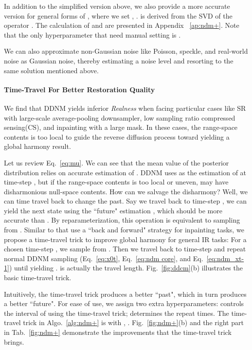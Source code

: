 \documentclass{article} \usepackage{iclr2023_conference,times}
\begin{document}
In addition to the simplified version above, we also provide a more accurate version for general forms of , where we set , .  is derived from the SVD of the operator 
. The calculation of  and  are presented in Appendix ~\ref{ap:ndm+}. Note that the only hyperparameter that need manual setting is .

We can also approximate non-Gaussian noise like Poisson, speckle, and real-world noise as Gaussian noise, thereby estimating a noise level  and resorting to the same solution mentioned above.

\paragraph{Time-Travel For Better Restoration Quality} We find that DDNM yields inferior \textit{Realness} when facing particular cases like SR with large-scale average-pooling downsampler, low sampling ratio compressed sensing(CS), and inpainting with a large mask. In these cases, the range-space contents  is too local to guide the reverse diffusion process toward yielding a global harmony result.

Let us review Eq.~\ref{eq:mu}. We can see that the mean value  of the posterior distribution  relies on accurate estimation of . DDNM uses  as the estimation of  at time-step , but if the range-space contents  is too local or uneven,  may have disharmonious null-space contents. How can we salvage the disharmony? Well, we can time travel back to change the past. Say we travel back to time-step , we can yield the next state  using the ``future" estimation  , which should be more accurate than . By reparameterization, this operation is equivalent to sampling  from . Similar to \cite{lugmayr2022repaint} that use a ``back and forward" strategy for inpainting tasks, we propose a time-travel trick to improve global harmony for general IR tasks: For a chosen time-step , we sample  from . Then we travel back to time-step  and repeat normal DDNM sampling (Eq.~\ref{eq:x0t}, Eq.~\ref{eq:ndm core}, and Eq.~\ref{eq:ndm_xt-1}) until yielding .  is actually the travel length. Fig.~\ref{fig:ddcm}(b) illustrates the basic time-travel trick.

Intuitively, the time-travel trick produces a better ``past", which in turn produces a better ``future". For ease of use, we assign two extra hyperparameters:  controls the interval of using the time-travel trick;  determines the repeat times. The time-travel trick in Algo.~\ref{alg:ndm+} is with , . Fig.~\ref{fig:ndm+}(b) and the right part in Tab.~\ref{fig:ndm+} demonstrate the improvements that the time-travel trick brings. 
\end{document}
